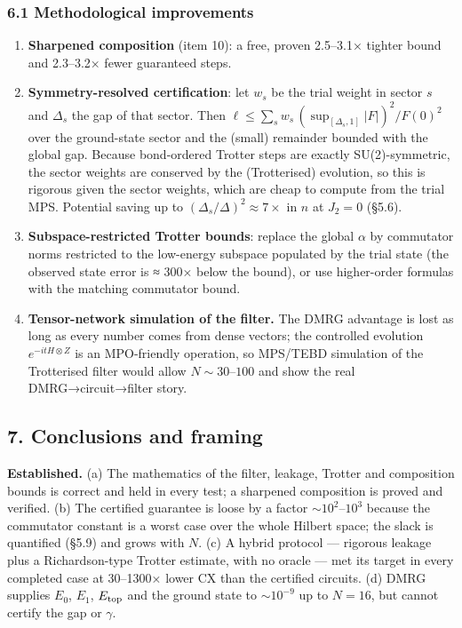 \documentclass[
]{article}
\providecommand{\tightlist}{%
  \setlength{\itemsep}{0pt}\setlength{\parskip}{0pt}}
\begin{document}
\hypertarget{methodological-improvements}{%
\subsubsection{6.1 Methodological
improvements}\label{methodological-improvements}}

\begin{enumerate}
\def\labelenumi{\arabic{enumi}.}
\tightlist
\item
  \textbf{Sharpened composition} (item 10): a free, proven 2.5--3.1×
  tighter bound and 2.3--3.2× fewer guaranteed steps.
\item
  \textbf{Symmetry-resolved certification}: let \(w_s\) be the trial
  weight in sector \(s\) and \(\Delta_s\) the gap of that sector. Then
  \(\ell\le\sum_sw_s\,(\sup_{[\Delta_s,1]}|F|)^2/F(0)^2\) over the
  ground-state sector and the (small) remainder bounded with the global
  gap. Because bond-ordered Trotter steps are exactly SU(2)-symmetric,
  the sector weights are conserved by the (Trotterised) evolution, so
  this is rigorous given the sector weights, which are cheap to compute
  from the trial MPS. Potential saving up to
  \((\Delta_s/\Delta)^2\approx7\times\) in \(n\) at \(J_2=0\) (§5.6).
\item
  \textbf{Subspace-restricted Trotter bounds}: replace the global
  \(\alpha\) by commutator norms restricted to the low-energy subspace
  populated by the trial state (the observed state error is ≈ 300× below
  the bound), or use higher-order formulas with the matching commutator
  bound.
\item
  \textbf{Tensor-network simulation of the filter.} The DMRG advantage
  is lost as long as every number comes from dense vectors; the
  controlled evolution \(e^{-itH\otimes Z}\) is an MPO-friendly
  operation, so MPS/TEBD simulation of the Trotterised filter would
  allow \(N\sim30\)--\(100\) and show the real DMRG→circuit→filter
  story.
\end{enumerate}

\hypertarget{conclusions-and-framing}{%
\subsection{7. Conclusions and framing}\label{conclusions-and-framing}}

\textbf{Established.} (a) The mathematics of the filter, leakage,
Trotter and composition bounds is correct and held in every test; a
sharpened composition is proved and verified. (b) The certified
guarantee is loose by a factor \(\sim10^{2}\)--\(10^{3}\) because the
commutator constant is a worst case over the whole Hilbert space; the
slack is quantified (§5.9) and grows with \(N\). (c) A hybrid protocol
--- rigorous leakage plus a Richardson-type Trotter estimate, with no
oracle --- met its target in every completed case at 30--1300× lower CX
than the certified circuits. (d) DMRG supplies \(E_0\), \(E_1\),
\(E_{\rm top}\) and the ground state to \(\sim10^{-9}\) up to \(N=16\),
but cannot certify the gap or \(\gamma\).
\end{document}
